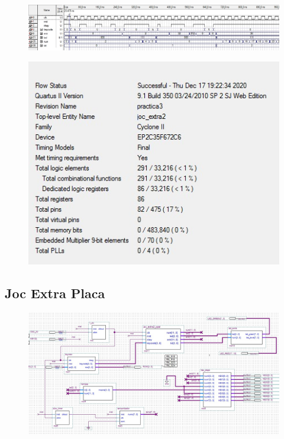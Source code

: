 \documentclass[12pt, a4papre]{article}
\begin{document}
	\begin{figure}[H]
	
	\begin{center}
		\includegraphics[width=130mm]{SimulacioJocExtra.jpeg}
		\end{center}
	\end{figure}
	
	
	\begin{figure}[H]
	
	\begin{center}
		\includegraphics[width=130mm]{informeJocExtra.jpeg}
		\end{center}
	\end{figure}
	

\subsection{Joc Extra Placa}

	\begin{figure}[H]
	
				\begin{center}
		\includegraphics[width=130mm]{JocExtraPlaca.jpeg}
		\end{center}
	\end{figure}
	
	
\end{document}
